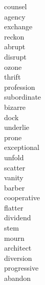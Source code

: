 \documentclass[b5paper, 11pt]{ctexart}
\begin{document}
\begin{multicols*}{3}
\begin{description}
\item[counsel]

\item[agency]

\item[exchange]

\item[reckon]

\item[abrupt]

\item[disrupt]

\item[ozone]

\item[thrift]

\item[profession]

\item[subordinate]

\item[bizarre]

\item[dock]

\item[underlie]

\item[prone]

\item[exceptional]

\item[unfold]

\item[scatter]

\item[vanity]

\item[barber]

\item[cooperative]

\item[flatter]

\item[dividend]

\item[stem]

\item[mourn]

\item[architect]

\item[diversion]

\item[progressive]

\item[abandon]


\end{description}
\end{multicols*}
\end{document}
